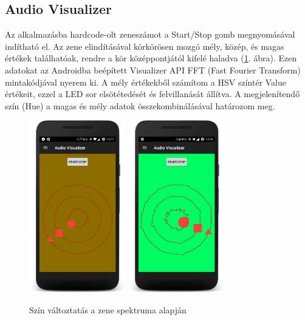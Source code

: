 \documentclass[../main.tex]{subfiles}
\begin{document}
        \subsection{Audio Visualizer}
            Az alkalmazásba hardcode-olt zeneszámot a Start/Stop gomb megnyomásával indítható el. Az zene elindításával körkörösen mozgó mély, közép, és magas értékek találhatóak, rendre a kör középpontjától kifelé haladva (\ref{fig:audio_visualizer}. ábra). Ezen adatokat az Androidba beépített Visualizer API FFT (Fast Fourier Transform) mintakódjával nyerem ki. A mély értékekből számítom a HSV színtér Value értékeit, ezzel a LED sor elsötétedését és felvillanását állítva. A megjelenítendő szín (Hue) a magas és mély adatok összekombinálásával határozom meg. 
            \begin{figure}[h!]
                \centering
                    \includegraphics[width=4.2cm]{android_res/screen_pictures/audio_vis_01}
                    \includegraphics[width=4.2cm]{android_res/screen_pictures/audio_vis_02}
                \caption{Szín változtatás a zene spektruma alapján}
                \label{fig:audio_visualizer}
            \end{figure}
\end{document}
